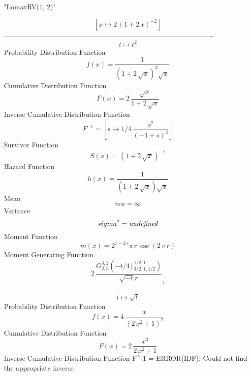 \documentclass[12pt]{article}
\begin{document}
 
                               "LomaxRV(1, 2)"

$$[x\mapsto 2\, \left( 1+2\,x \right) ^{-2}]
$$-------------------------------------------------------------------------------------------  \\$$t\mapsto {t}^{2}
$$Probability Distribution Function 
$$  f(x)={\frac {1}{ \left( 1+2\,\sqrt {x} \right) ^{2}\sqrt {x}}}
$$Cumulative Distribution Function  
 $$F(x)=2\,{\frac {\sqrt {x}}{1+2\,\sqrt {x}}}
$$ Inverse Cumulative Distribution Function 
  $$F^{-1} = [s\mapsto 1/4\,{\frac {{s}^{2}}{ \left( -1+s \right) ^{2}}}]
$$Survivor Function 
 $$ S(x)= \left( 1+2\,\sqrt {x} \right) ^{-1}
$$ Hazard Function 
 $$ h(x)={\frac {1}{ \left( 1+2\,\sqrt {x} \right) \sqrt {x}}}
$$Mean 
 $$ mu=\infty 
$$ Variance 
 $$ sigma^2 = {\it undefined}
$$Moment Function 
 $$ m(x) = {2}^{1-2\,r}\pi\,r\,\csc \left( 2\,\pi\,r \right) 
$$ Moment Generating Function 
 $$2\,{\frac {
G^{3, 2}_{2, 3}\left(-t/4\, \Big\vert\,^{1/2, 1}_{3/2, 1, 1/2}\right)
}{\sqrt {-t}\pi}}_{{1}}
$$-------------------------------------------------------------------------------------------  \\$$t\mapsto \sqrt {t}
$$Probability Distribution Function 
$$  f(x)=4\,{\frac {x}{ \left( 2\,{x}^{2}+1 \right) ^{2}}}
$$Cumulative Distribution Function  
 $$F(x)=2\,{\frac {{x}^{2}}{2\,{x}^{2}+1}}
$$ Inverse Cumulative Distribution Function 
  $$F^{-1} =              ERROR(IDF): Could not find the appropriate inverse
\end{document}
